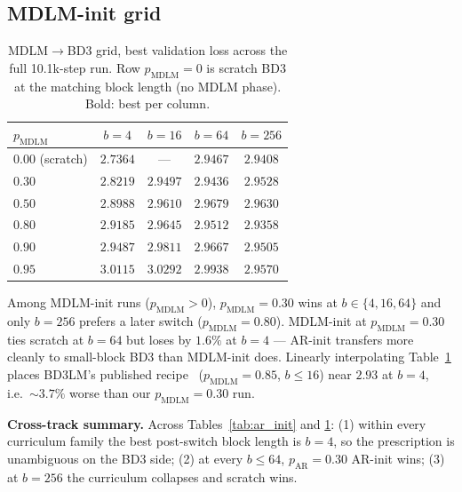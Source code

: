 \documentclass{article}
\newcommand{\pAR}{p_{\mathrm{AR}}}
\begin{document}
\subsection{MDLM-init grid}

\begin{table}[h]
\centering
\caption{MDLM$\to$BD3 grid, best validation loss across the full 10.1k-step run. Row $p_{\mathrm{MDLM}}{=}0$ is scratch BD3 at the matching block length (no MDLM phase). Bold: best per column.}
\label{tab:mdlm_init}
\small
\begin{tabular}{lcccc}
\toprule
$p_{\mathrm{MDLM}}$ & $b{=}4$ & $b{=}16$ & $b{=}64$ & $b{=}256$ \\
\midrule
$0.00$ (scratch) & $\mathbf{2.7364}$ & ---     & $2.9467$ & $2.9408$ \\
$0.30$           & $2.8219$ & $\mathbf{2.9497}$ & $\mathbf{2.9436}$ & $2.9528$ \\
$0.50$           & $2.8988$ & $2.9610$ & $2.9679$ & $2.9630$ \\
$0.80$           & $2.9185$ & $2.9645$ & $2.9512$ & $\mathbf{2.9358}$ \\
$0.90$           & $2.9487$ & $2.9811$ & $2.9667$ & $2.9505$ \\
$0.95$           & $3.0115$ & $3.0292$ & $2.9938$ & $2.9570$ \\
\bottomrule
\end{tabular}
\end{table}

Among MDLM-init runs ($p_{\mathrm{MDLM}}{>}0$), $p_{\mathrm{MDLM}}{=}0.30$ wins at $b \in \{4, 16, 64\}$ and only $b{=}256$ prefers a later switch ($p_{\mathrm{MDLM}}{=}0.80$). MDLM-init at $p_{\mathrm{MDLM}}{=}0.30$ ties scratch at $b{=}64$ but loses by $1.6\%$ at $b{=}4$ --- AR-init transfers more cleanly to small-block BD3 than MDLM-init does. Linearly interpolating Table~\ref{tab:mdlm_init} places BD3LM's published recipe~\citep{arriola2025block} ($p_{\mathrm{MDLM}}{=}0.85$, $b{\le}16$) near $2.93$ at $b{=}4$, i.e.\ ${\sim}3.7\%$ worse than our $p_{\mathrm{MDLM}}{=}0.30$ run.

\textbf{Cross-track summary.} Across Tables~\ref{tab:ar_init} and \ref{tab:mdlm_init}: (1) within every curriculum family the best post-switch block length is $b{=}4$, so the prescription is unambiguous on the BD3 side; (2) at every $b \le 64$, $\pAR{=}0.30$ AR-init wins; (3) at $b{=}256$ the curriculum collapses and scratch wins.

\end{document}
